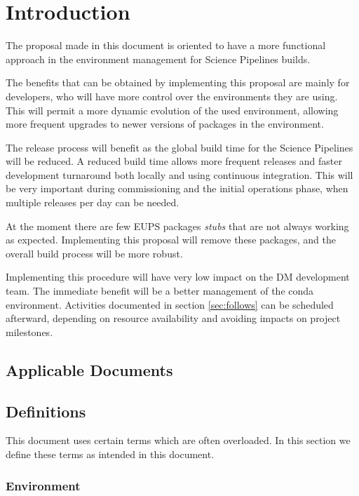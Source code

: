 \section{Introduction} \label{sec:intro}

The proposal made in this document is oriented to have a more functional approach in the environment management for Science Pipelines builds.

The benefits that can be obtained by implementing this proposal are mainly for developers, who will have more control over the environments they are using. 
This will permit a more dynamic evolution of the used environment, allowing more frequent upgrades to newer versions of packages in the environment. 

The release process will  benefit as the global build time for the Science Pipelines  will be reduced. 
A reduced build time allows more frequent releases and faster development turnaround both locally and using continuous integration.
This will be very important during commissioning and the initial operations phase, when multiple releases per day can be needed.

At the moment there are few EUPS packages \textit{stubs} that are not always working as expected.
Implementing this proposal will remove these packages, and the overall build process will be more robust.

Implementing this procedure will have very low impact on the DM development team.
The immediate benefit will be a better management of the conda environment.
Activities documented in section \ref{sec:follows} can be scheduled afterward, depending on resource availability and avoiding impacts on project milestones.


\subsection{Applicable Documents}


\subsection{Definitions}

This document uses certain terms which are often overloaded. In this section we define these terms  as intended in this document.

\subsubsection{Environment} \label{sec:envdef}

